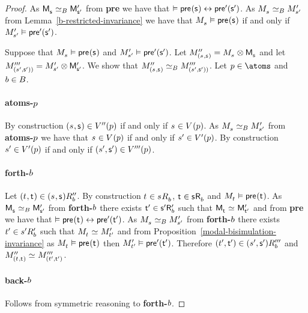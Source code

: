 \begin{proof}
As $\aPModel{\aStateS} \bisimilar[\agentsB] \aPModelP{\aStateSP}$ from {\bf pre} we have that $\entails \aPrecondition(\aStateS) \iff \aPreconditionP(\aStateSP)$.
As $\kPModel{\kStateS} \bisimilar[\agentsB] \kPModelP{\kStateSP}$ from Lemma~\ref{b-restricted-invariance} we have that $\kPModel{\kStateS} \entails \aPrecondition(\aStateS)$ if and only if ${M^{\prime}_{{s}^{\prime}}} \vDash {\mathsf{pre}^{\prime}}({\mathsf{{s}}^{\prime}})$.

Suppose that $\kPModel{\kStateS} \entails \aPrecondition(\aStateS)$ and ${M^{\prime}_{{s}^{\prime}}} \vDash {\mathsf{pre}^{\prime}}({\mathsf{{s}}^{\prime}})$.
Let $\kPModelPP{(\kStateS, \aStateS)} = \kPModel{\kStateS} \exec \aPModel{\aStateS}$ and let ${M^{\prime\prime\prime}_{({s}^{\prime}, {\mathsf{{s}}^{\prime}}))}} = {M^{\prime}_{{s}^{\prime}}} \otimes {\mathsf{M}^{\prime}_{{\mathsf{{s}}^{\prime}}}}$.
We show that $\kPModelPP{(\kStateS, \aStateS)} \bisimilar[\agentsB] \kPModelPPP{(\kStateSP, \aStateSP))}$.
Let $\atomP \in \atoms$ and $b \in B$.

\paragraph{atoms-$p$}
By construction $(\kStateS, \aStateS) \in \kValuationPP(\atomP)$ if and only if $\kStateS \in \kValuation(\atomP)$.
As $\kPModel{\kStateS} \bisimilar[\agentsB] \kPModelP{\kStateSP}$ from {\bf atoms-$p$} we have that $\kStateS \in \kValuation(\atomP)$ if and only if ${s}^{\prime} \in {V^{\prime}}(p)$.
By construction ${s}^{\prime} \in {V^{\prime}}(p)$ if and only if $({s}^{\prime}, {\mathsf{{s}}^{\prime}}) \in {V^{\prime\prime\prime}}(p)$.

\paragraph{forth-$b$}
Let $(\kStateT, \aStateT) \in \kSuccessorsPPB{(\kStateS, \aStateS)}$.
By construction $\kStateT \in \kSuccessorsB{\kStateS}$, $\aStateT \in \aSuccessorsB{\aStateS}$ and $\kPModel{\kStateT} \entails \aPrecondition(\aStateT)$.
As $\aPModel{\aStateS} \bisimilar[\agentsB] \aPModelP{\aStateSP}$ from {\bf forth-$b$} there exists ${\mathsf{{t}}^{\prime}} \in {{\mathsf{{s}}^{\prime}}} {\mathsf{R}^{\prime}_{b}}$ such that $\aPModel{\aStateT} \bisimilar \aPModelP{\aStateTP}$ and from {\bf pre} we have that $\entails \aPrecondition(\aStateT) \iff \aPreconditionP(\aStateTP)$.
As $\kPModel{\kStateS} \bisimilar[\agentsB] \kPModelP{\kStateSP}$ from {\bf forth-$b$} there exists ${t}^{\prime} \in {{s}^{\prime}} {R^{\prime}_{b}}$ such that $\kPModel{\kStateT} \bisimilar \kPModelP{\kStateTP}$ and from Proposition~\ref{modal-bisimulation-invariance} as $\kPModel{\kStateT} \entails \aPrecondition(\aStateT)$ then ${M^{\prime}_{{t}^{\prime}}} \vDash {\mathsf{pre}^{\prime}}({\mathsf{{t}}^{\prime}})$.
Therefore $({t}^{\prime}, {\mathsf{{t}}^{\prime}}) \in {({s}^{\prime}, {\mathsf{{s}}^{\prime}})} {R^{\prime\prime\prime}_{b}}$ and $\kPModelPP{(\kStateT, \aStateT)} \bisimilar \kPModelPPP{(\kStateTP, \aStateTP)}$.

\paragraph{back-$b$}
Follows from symmetric reasoning to {\bf forth-$b$}.
\end{proof}

